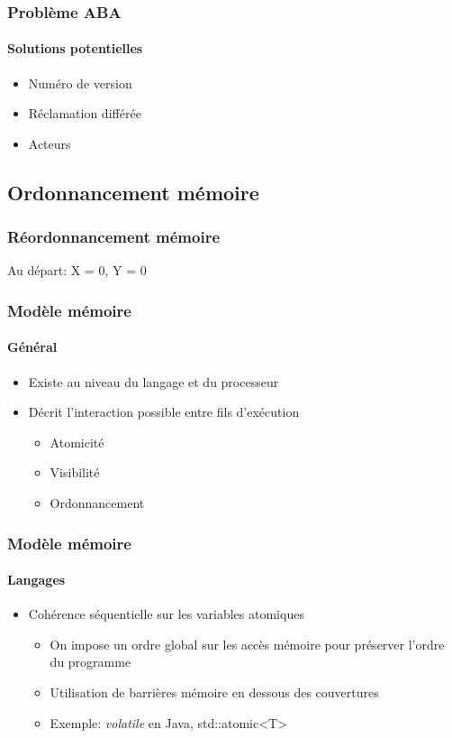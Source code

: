 \documentclass{beamer}
\begin{document}
\begin{frame}
\frametitle{Problème ABA}
\framesubtitle{Solutions potentielles}
\begin{itemize}
\item Numéro de version
\item Réclamation différée
\item Acteurs
\end{itemize}
\end{frame}

\subsection{Ordonnancement mémoire}
\begin{frame}
\frametitle{Réordonnancement mémoire}
Au départ: X = 0, Y = 0

\end{frame}

\begin{frame}
\frametitle{Modèle mémoire}
\framesubtitle{Général}
\begin{itemize}
\item Existe au niveau du langage et du processeur
\item Décrit l'interaction possible entre fils d'exécution
\begin{itemize}
\item Atomicité
\item Visibilité
\item Ordonnancement
\end{itemize}
\end{itemize}
\end{frame}

\begin{frame}
\frametitle{Modèle mémoire}
\framesubtitle{Langages}
\begin{itemize}
\item Cohérence séquentielle sur les variables atomiques
\begin{itemize}
\item On impose un ordre global sur les accès mémoire pour préserver l'ordre du programme
\item Utilisation de barrières mémoire en dessous des couvertures
\item Exemple: \textit{volatile} en Java, std::atomic\textless T\textgreater
\end{itemize}
\end{itemize}
\end{frame}
\end{document}
